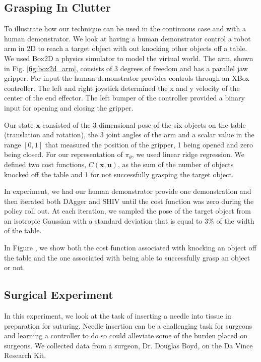 \documentclass[10pt, conference]{ieeeconf}      %
\newcommand{\bu}{\mathbf{u}}
\newcommand{\bx}{\mathbf{x}}
\begin{document}
\subsection{Grasping In Clutter}
To illustrate how our technique can be used in the continuous case and with a human demonstrator. 
We look at having a human demonstrator control a robot arm in 2D to reach a target object with out knocking other objects off a table. We used Box2D a physics simulator to model the virtual world. The arm, shown in Fig. \ref{fig:box2d_arm}, consists of 3 degrees of freedom and has a parallel jaw gripper. For input the human demonstrator provides controls through an XBox controller. The left and right joystick determined the x and y velocity of the center of the end effector. The left bumper of the controller provided a binary input for opening and closing the gripper. 

Our state $\bx$ consisted of the 3 dimensional pose of the six objects on the table (translation and rotation), the 3 joint angles of the arm and a scalar value in the range $[0,1]$ that measured the position of the gripper, 1 being opened and zero being closed. For our representation of $\pi_{\theta}$, we used linear ridge regression. We defined two cost functions, $C(\bx,\bu)$, as the sum of the number of objects knocked off the table and 1 for not successfully grasping the target object. 

In experiment, we had our human demonstrator provide one demonstration and then iterated both  DAgger and SHIV until the cost function was zero during the policy roll out. At each iteration, we sampled the pose of the target object from an isotropic Gaussian with a standard deviation that is equal to $3\%$ of the width of the table. 

In Figure , we show both the cost function associated with knocking an object off the table and the one associated with being able to successfully grasp an object or not. 




\subsection{Surgical Experiment}
In this experiment, we look at the task of inserting a needle into tissue in preparation for suturing. Needle insertion can be a challenging task for surgeons and learning a controller to do so could alleviate some of the burden placed on surgeons. We collected data from a surgeon, Dr. Douglas Boyd, on the Da Vince Research Kit. 
\end{document}
